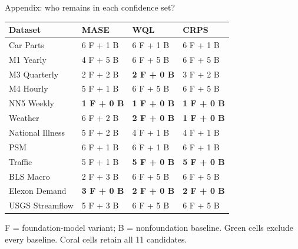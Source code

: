\documentclass[aspectratio=169,10pt]{beamer}
\begin{document}
\begin{frame}[noframenumbering]{Appendix: who remains in each confidence set?}
  \vspace{0.02cm}
  \begin{center}
    \fontsize{7.0}{7.8}\selectfont
    \renewcommand{\arraystretch}{1.08}
    \setlength{\tabcolsep}{5.4pt}
    \begin{tabular}{L{3.20cm} C{2.95cm} C{2.95cm} C{2.95cm}}
      \toprule
      \textbf{Dataset} & \textbf{MASE} & \textbf{WQL} & \textbf{CRPS} \\
      \midrule
      Car Parts & 6 F + 1 B & 6 F + 1 B & 6 F + 1 B \\
       M1 Yearly & 4 F + 5 B & 6 F + 5 B & 6 F + 5 B \\
      M3 Quarterly & 2 F + 2 B & \textbf{2 F + 0 B} & 3 F + 2 B \\
       M4 Hourly & 5 F + 1 B & 6 F + 5 B & 6 F + 5 B \\
      NN5 Weekly & \textbf{1 F + 0 B} & \textbf{1 F + 0 B} & \textbf{1 F + 0 B} \\
       Weather & 6 F + 2 B & \textbf{2 F + 0 B} & \textbf{1 F + 0 B} \\
      National Illness & 5 F + 2 B & 4 F + 1 B & 4 F + 1 B \\
       PSM & 6 F + 1 B & 6 F + 1 B & 6 F + 1 B \\
      Traffic & 5 F + 1 B & \textbf{5 F + 0 B} & \textbf{5 F + 0 B} \\
       BLS Macro & 2 F + 3 B & 6 F + 5 B & 6 F + 5 B \\
      Elexon Demand & \textbf{3 F + 0 B} & \textbf{2 F + 0 B} & \textbf{2 F + 0 B} \\
       USGS Streamflow & 5 F + 3 B & 6 F + 5 B & 6 F + 5 B \\
      \bottomrule
    \end{tabular}
  \end{center}

  \vspace{0.09cm}
  \begin{center}\scriptsize
    F = foundation-model variant; B = nonfoundation baseline.
    Green cells exclude every baseline. Coral cells retain all 11 candidates.
  \end{center}
\end{frame}
\end{document}
